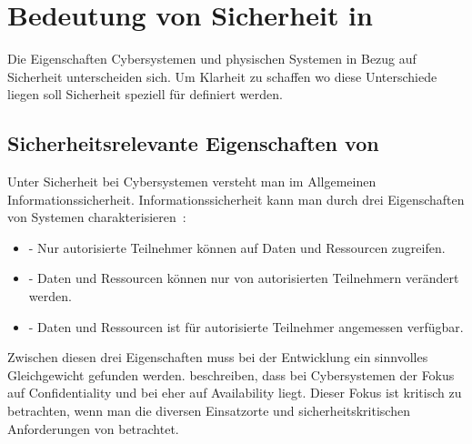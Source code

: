 
\section{Bedeutung von Sicherheit in }\label{sec:bedeutung-sicherheit}

Die Eigenschaften Cybersystemen und physischen Systemen in Bezug auf Sicherheit unterscheiden sich.
Um Klarheit zu schaffen wo diese Unterschiede liegen soll Sicherheit speziell für \cps definiert werden.

\subsection{Sicherheitsrelevante Eigenschaften von }\label{subsec:definition}
Unter Sicherheit bei Cybersystemen versteht man im Allgemeinen Informationssicherheit.
Informationssicherheit kann man durch drei Eigenschaften von Systemen charakterisieren~\cite{Cherdantseva2013}:
\begin{itemize}[noitemsep,wide=0pt]
    \item {} - Nur autorisierte Teilnehmer können auf Daten und Ressourcen zugreifen.\label{def:confidentiality}
    \item {} - Daten und Ressourcen können nur von autorisierten Teilnehmern verändert werden.\label{def:integrity}
    \item {} - Daten und Ressourcen ist für autorisierte Teilnehmer angemessen verfügbar.\label{def:availability}
\end{itemize}

Zwischen diesen drei Eigenschaften muss bei der Entwicklung ein sinnvolles Gleichgewicht gefunden werden.
\citeauthor{GK16} beschreiben, dass bei Cybersystemen der Fokus auf Confidentiality und bei \cps eher auf Availability liegt.
Dieser Fokus ist kritisch zu betrachten, wenn man die diversen Einsatzorte und sicherheitskritischen Anforderungen von \cps betrachtet.

